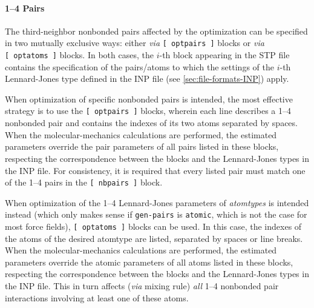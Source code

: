 \documentclass[10pt,a4paper,openany]{memoir}
\numberwithin{equation}{section}
\begin{document}

\paragraph{1--4 Pairs}

The third-neighbor nonbonded pairs affected by the optimization can be
specified in two mutually exclusive ways: either \textit{via}
\texttt{[~optpairs~]} blocks or \textit{via} \texttt{[~optatoms~]}
blocks. In both cases, the $i$-th block appearing in the STP file
contains the specification of the pairs/atoms to which the settings of
the $i$-th Lennard-Jones type defined in the INP file (see
\autoref{sec:file-formats-INP}) apply.

When optimization of specific nonbonded pairs is intended, the most
effective strategy is to use the \texttt{[~optpairs~]} blocks, wherein
each line describes a 1--4 nonbonded pair and contains the indexes of
its two atoms separated by spaces.  When the molecular-mechanics
calculations are performed, the estimated parameters override the pair
parameters of all pairs listed in these blocks, respecting the
correspondence between the blocks and the Lennard-Jones types in the
INP file.  For consistency, it is required that every listed pair must
match one of the 1--4 pairs in the \texttt{[~nbpairs~]} block.

When optimization of the 1--4 Lennard-Jones parameters of
\textit{atomtypes} is intended instead (which only makes sense if
\texttt{gen-pairs} is \texttt{atomic}, which is not the case for most
force fields), \texttt{[~optatoms~]} blocks can be used.  In this
case, the indexes of the atoms of the desired atomtype are listed,
separated by spaces or line breaks.  When the molecular-mechanics
calculations are performed, the estimated parameters override the
atomic parameters of all atoms listed in these blocks, respecting the
correspondence between the blocks and the Lennard-Jones types in the
INP file.  This in turn affects (\textit{via} mixing rule)
\textit{all} 1--4 nonbonded pair interactions involving at least one
of these atoms.
\end{document}
